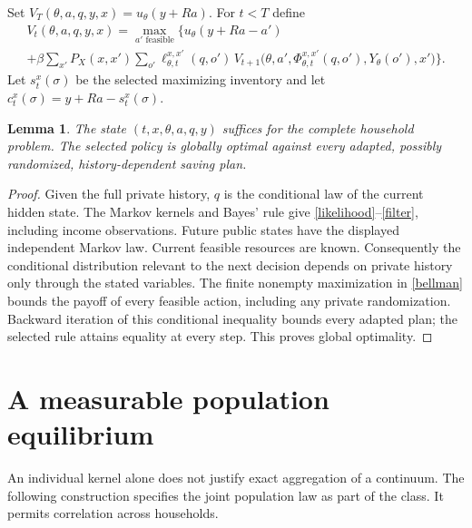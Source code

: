 \documentclass[11pt]{article}
\newtheorem{lemma}{Lemma}
\begin{document}
Set $V_T(\theta,a,q,y,x)=u_\theta(y+Ra)$. For $t<T$ define
\begin{multline}\label{bellman}
 V_t(\theta,a,q,y,x)=\max_{a'\text{ feasible}}\bigg\{
 u_\theta(y+Ra-a')\\
 +\beta\sum_{x'}P_X(x,x')
 \sum_{o'}\ell^{x,x'}_{\theta,t}(q,o')\,
 V_{t+1}\bigl(\theta,a',\Phi^{x,x'}_{\theta,t}(q,o'),Y_\theta(o'),x'\bigr)
 \bigg\}.
\end{multline}
Let $s_t^x(\sigma)$ be the selected maximizing inventory and let
$c_t^x(\sigma)=y+Ra-s_t^x(\sigma)$.

\begin{lemma}\label{individual}
The state $(t,x,\theta,a,q,y)$ suffices for the complete household problem. The selected policy is globally optimal against every adapted, possibly randomized, history-dependent saving plan.
\end{lemma}
\begin{proof}
Given the full private history, $q$ is the conditional law of the current hidden state. The Markov kernels and Bayes' rule give \eqref{likelihood}--\eqref{filter}, including income observations. Future public states have the displayed independent Markov law. Current feasible resources are known. Consequently the conditional distribution relevant to the next decision depends on private history only through the stated variables. The finite nonempty maximization in \eqref{bellman} bounds the payoff of every feasible action, including any private randomization. Backward iteration of this conditional inequality bounds every adapted plan; the selected rule attains equality at every step. This proves global optimality.
\end{proof}

\section{A measurable population equilibrium}
An individual kernel alone does not justify exact aggregation of a continuum. The following construction specifies the joint population law as part of the class. It permits correlation across households.
\end{document}
